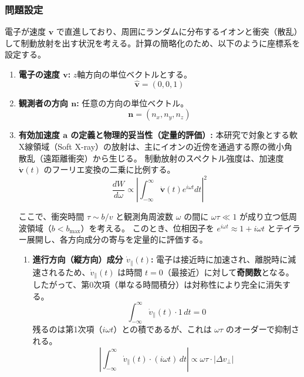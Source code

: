 \documentclass[a4paper,11pt]{bxjsarticle} %
\begin{document}
\subsubsection{問題設定}
電子が速度 $\bm{v}$ で直進しており、周囲にランダムに分布するイオンと衝突（散乱）して制動放射を出す状況を考える。計算の簡略化のため、以下のように座標系を設定する。

\begin{enumerate}
    \item \textbf{電子の速度 $\bm{v}$:} $z$軸方向の単位ベクトルとする。
    \begin{equation}
        \hat{\bm{v}} = (0, 0, 1)
    \end{equation}
    
    \item \textbf{観測者の方向 $\bm{n}$:} 任意の方向の単位ベクトル。
    \begin{equation}
        \bm{n} = (n_x, n_y, n_z)
    \end{equation}
    
    \item \textbf{有効加速度 $\bm{a}$ の定義と物理的妥当性（定量的評価）:} 
    本研究で対象とする軟X線領域（Soft X-ray）の放射は、主にイオンの近傍を通過する際の微小角散乱（遠距離衝突）から生じる。
    制動放射のスペクトル強度は、加速度 $\dot{\bm{v}}(t)$ のフーリエ変換の二乗に比例する。
    \begin{equation}
        \frac{dW}{d\omega} \propto \left| \int_{-\infty}^{\infty} \dot{\bm{v}}(t) e^{i\omega t} dt \right|^2
    \end{equation}

    ここで、衝突時間 $\tau \sim b/v$ と観測角周波数 $\omega$ の間に $\omega \tau \ll 1$ が成り立つ低周波領域（$b < b_{\max}$）を考える。
    このとき、位相因子を $e^{i\omega t} \approx 1 + i\omega t$ とテイラー展開し、各方向成分の寄与を定量的に評価する。

    \begin{enumerate}
        \item \textbf{進行方向（縦方向）成分 $\dot{v}_{\parallel}(t)$:} 
        電子は接近時に加速され、離脱時に減速されるため、$\dot{v}_{\parallel}(t)$ は時間 $t=0$（最接近）に対して\textbf{奇関数}となる。
        したがって、第0次項（単なる時間積分）は対称性により完全に消失する。
        \begin{equation}
            \int_{-\infty}^{\infty} \dot{v}_{\parallel}(t) \cdot 1 \, dt = 0
        \end{equation}
        残るのは第1次項（$i\omega t$）との積であるが、これは $\omega \tau$ のオーダーで抑制される。
        \begin{equation}
            \left| \int_{-\infty}^{\infty} \dot{v}_{\parallel}(t) \cdot (i\omega t) \, dt \right| \propto \omega \tau \cdot |\Delta v_{\perp}|
        \end{equation}


\end{enumerate}
\end{enumerate}
\end{document}
